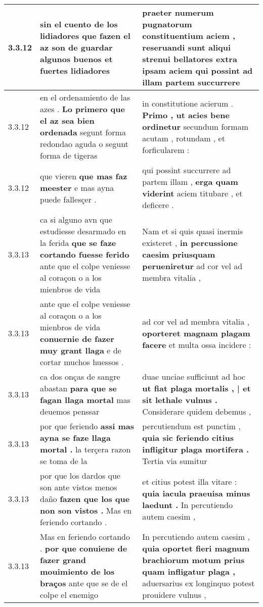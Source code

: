 \begin{tabular}{|p{1cm}|p{6.5cm}|p{6.5cm}|}
3.3.12 & sin el cuento de los lidiadores \textbf{ que fazen el az son de guardar algunos buenos } et fuertes lidiadores & praeter numerum pugnatorum constituentium aciem , \textbf{ reseruandi sunt aliqui strenui bellatores extra ipsam aciem } qui possint ad illam partem succurrere \\\hline
3.3.12 & en el ordenamiento de las azes . \textbf{ Lo primero que el az sea bien ordenada } segunt forma redondao aguda o segunt forma de tigeras & in constitutione acierum . \textbf{ Primo , ut acies bene ordinetur } secundum formam acutam , rotundam , et forficularem : \\\hline
3.3.12 & que vieren \textbf{ que mas faz meester } e mas ayna puede fallesçer . & qui possint succurrere ad partem illam , \textbf{ erga quam viderint } aciem titubare , et deficere . \\\hline
3.3.13 & ca si alguno avn que estudiesse desarmado en la ferida \textbf{ que se faze cortando fuesse ferido } ante que el colpe veniesse al coraçon o a los mienbros de vida & Nam et si quis quasi inermis existeret , \textbf{ in percussione caesim priusquam perueniretur } ad cor vel ad membra vitalia , \\\hline
3.3.13 & ante que el colpe veniesse al coraçon o a los mienbros de vida \textbf{ conuernie de fazer muy grant llaga } e de cortar muchos huessos . & ad cor vel ad membra vitalia , \textbf{ oporteret magnam plagam facere } et multa ossa incidere : \\\hline
3.3.13 & ca dos onças de sangre abastan \textbf{ para que se fagan llaga mortal } mas deuemos penssar & duae unciae sufficiunt ad hoc \textbf{ ut fiat plaga mortalis , | et sit lethale vulnus . } Considerare quidem debemus , \\\hline
3.3.13 & por que feriendo \textbf{ assi mas ayna se faze llaga mortal . } la terçera razon se toma de la & percutiendum est punctim , \textbf{ quia sic feriendo citius infligitur plaga mortifera . } Tertia via sumitur \\\hline
3.3.13 & por que los dardos que son ante vistos menos daño \textbf{ fazen que los que non son vistos . } Mas en feriendo cortando . & et citius potest illa vitare : \textbf{ quia iacula praeuisa minus laedunt . } In percutiendo autem caesim , \\\hline
3.3.13 & Mas en feriendo cortando . \textbf{ por que conuiene de fazer grand mouimiento de los braços } ante que se de el colpe el enemigo & In percutiendo autem caesim , \textbf{ quia oportet fieri magnum brachiorum motum prius quam infligatur plaga , } aduersarius ex longinquo potest prouidere vulnus , \\\hline

\end{tabular}
